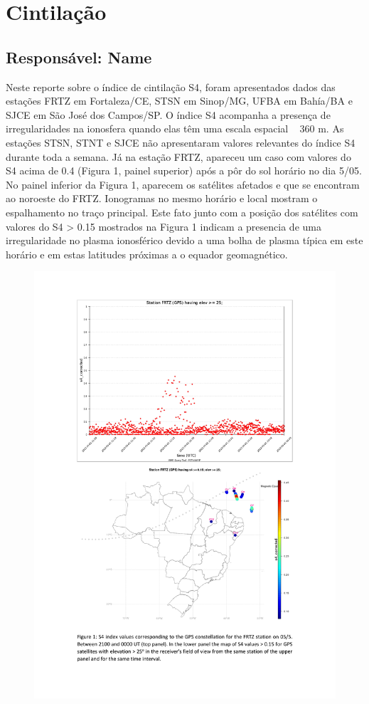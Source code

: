 \documentclass[a4paper, 10pt]{article}
\begin{document}
\section{Cintilação} 
 \subsection{Responsável: Name} 
 
Neste reporte sobre o índice de cintilação S4, foram apresentados dados das 
estações FRTZ em Fortaleza/CE, STSN em Sinop/MG, UFBA em Bahía/BA e 
SJCE em São José dos Campos/SP. O índice S4 acompanha a presença de 
irregularidades na ionosfera quando elas têm uma escala espacial ~ 360 m.  
As estações STSN, STNT e SJCE não apresentaram valores relevantes do 
índice S4 durante toda a semana. Já na estação FRTZ, apareceu um caso com 
valores do S4 acima de 0.4 (Figura 1, painel superior) após a pôr do sol horário 
no dia 5/05. No painel inferior da Figura 1, aparecem os satélites afetados e que 
se encontram ao noroeste do FRTZ. Ionogramas no mesmo horário e local 
mostram o espalhamento no traço principal. Este fato junto com a posição dos 
satélites com valores do S4 > 0.15 mostrados na Figura 1 indicam a presencia 
de uma irregularidade no plasma ionosférico devido a uma bolha de plasma 
típica em este horário e em estas latitudes próximas a o equador geomagnético. 

    \begin{figure}[H]
        \centering
        \includegraphics[width=14cm]{./figures/pt_outfileScint_0.jpg}
    \end{figure} 
 
\end{document}
